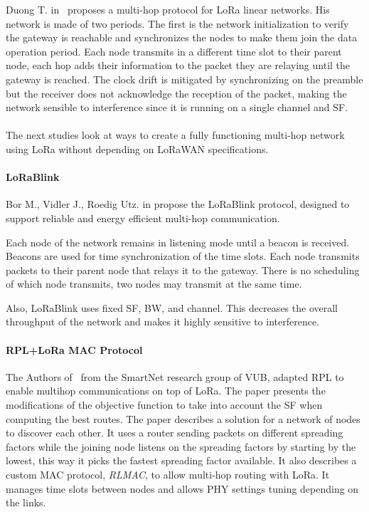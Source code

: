 Duong T. in~\cite{duong2018} proposes a multi-hop protocol for LoRa linear
networks. 
His network is made of two periods. The first is the network initialization to
verify the gateway is reachable and synchronizes the nodes to make them join the 
data operation period.
Each node transmits in a different time slot to their parent node, each hop adds
their information to the packet they are relaying until the gateway is
reached.
The clock drift is mitigated by synchronizing on the preamble but the receiver
does not acknowledge the reception of the packet, making the network sensible to
interference since it is running on a single channel and SF.

\paragraph{}

The next studies look at ways to create a fully functioning multi-hop network
using LoRa without depending on LoRaWAN specifications.

\paragraph{LoRaBlink}

Bor M., Vidler J., Roedig Utz. in \cite{lorablink} propose the LoRaBlink
protocol, designed to support reliable and energy efficient multi-hop
communication.

Each node of the network remains in listening mode until a beacon is received.
Beacons are used for time synchronization of the time slots.
Each node transmits packets to their parent node that relays it to the gateway.
There is no scheduling of which node transmits, two nodes may
transmit at the same time.


Also, LoRaBlink uses fixed SF, BW, and channel. This decreases the overall throughput 
of the network and makes it highly sensitive to interference.

\paragraph{RPL+LoRa MAC Protocol}

The Authors of~\cite{8115756} from the SmartNet research group of VUB, adapted RPL 
to enable multihop communications on top of LoRa. 
The paper presents the modifications of the objective function to take into
account the SF when computing the best routes.
The paper describes a solution for a network of nodes to discover each other.
It uses a router sending packets on different spreading factors while the joining
node listens on the spreading factors by starting by the lowest, this way it
picks the fastest spreading factor available.
It also describes a custom MAC protocol, \emph{RLMAC}, to allow multi-hop
routing with LoRa. It manages time slots between nodes and allows PHY settings
tuning depending on the links.

